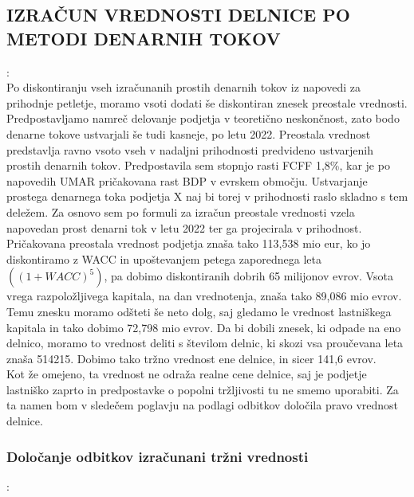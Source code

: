 \documentclass[12pt,a4paper]{amsart}
\theoremstyle{definition} %
\theoremstyle{plain} %
\begin{document}
\subsection{IZRAČUN VREDNOSTI DELNICE PO METODI DENARNIH TOKOV}:\\

Po diskontiranju vseh izračunanih prostih denarnih tokov iz napovedi za prihodnje petletje, moramo vsoti dodati še diskontiran znesek preostale vrednosti. Predpostavljamo namreč delovanje podjetja v teoretično neskončnost, zato bodo denarne tokove ustvarjali še tudi kasneje, po letu 2022. Preostala vrednost predstavlja ravno vsoto vseh v nadaljni prihodnosti predvideno ustvarjenih prostih denarnih tokov. Predpostavila sem stopnjo rasti FCFF 1,8\%, kar je po napovedih UMAR pričakovana rast BDP v evrskem območju. Ustvarjanje prostega denarnega toka podjetja X naj bi torej v prihodnosti raslo skladno s tem deležem. Za osnovo sem po formuli za izračun preostale vrednosti vzela napovedan prost denarni tok v letu 2022 ter ga projecirala v prihodnost. Pričakovana preostala vrednost podjetja znaša tako 113,538 mio eur, ko jo diskontiramo z WACC in upoštevanjem petega zaporednega leta $((1+WACC)^5)$, pa dobimo diskontiranih dobrih 65 milijonov evrov. Vsota vrega razpoložljivega kapitala, na dan vrednotenja, znaša tako 89,086 mio evrov. Temu znesku moramo odšteti še neto dolg, saj gledamo le vrednost lastniškega kapitala in tako dobimo 72,798 mio evrov. Da bi dobili znesek, ki odpade na eno delnico, moramo to vrednost deliti s številom delnic, ki skozi vsa proučevana leta znaša 514215. Dobimo tako tržno vrednost ene delnice, in sicer 141,6 evrov. \\
Kot že omejeno, ta vrednost ne odraža realne cene delnice, saj je podjetje lastniško zaprto in predpostavke o popolni tržljivosti tu ne smemo uporabiti. Za ta namen bom v sledečem poglavju na podlagi odbitkov določila pravo vrednost delnice.\\

\subsubsection{Določanje odbitkov izračunani tržni vrednosti}:\\
\end{document}
